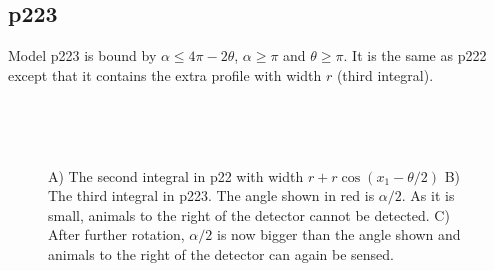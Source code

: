 

\subsection{p223} \label{p223}

Model p223 is bound by $\alpha \le 4\pi - 2\theta$, $\alpha \ge \pi$ and $\theta \ge \pi$. It is the same as p222 except that it contains the extra profile with width $r$ (third integral).





\begin{figure}[t]
        \centering
        \begin{subfigure}[t]{0.3\textwidth}
                \centering
                \caption{}
                \label{f:p22Limit}
        \end{subfigure}
        ~ 
        \begin{subfigure}[t]{0.3\textwidth}
                \centering
                \caption{}
                \label{f:p223third}
        \end{subfigure}
        ~ 
        \begin{subfigure}[t]{0.3\textwidth}
                \centering
                \caption{}
                \label{f:p223fourth}
        \end{subfigure}
\caption{A) The second integral in p22 with width $r + r\cos(x_1 - \theta/2)$ B) The third integral in p223. The angle shown in red is $\alpha/2$. As it is small, animals to the right of the detector cannot be detected. C) After further rotation, $\alpha/2$ is now bigger than the angle shown and animals to the right of the detector can again be sensed.   }
\label{f:p22}
\end{figure}


